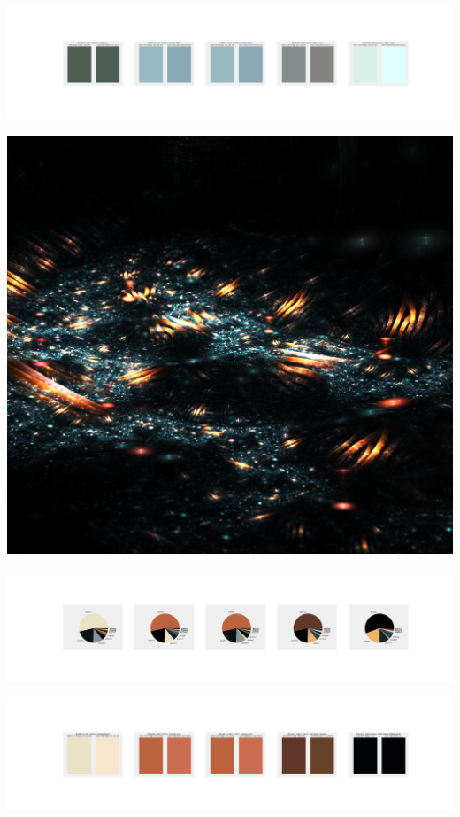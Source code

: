 \documentclass[11pt]{article}
\begin{document}
\begin{landscape}
    \begin{center}
    \includegraphics[width=250mm]{./nbimg/peak-441.jpg}
    \end{center}
    

    \begin{center}
    \includegraphics[width=\textwidth]{./nbimg/file (91).jpg}
    \end{center}

    \begin{center}
    \includegraphics[width=250mm]{./nbimg/pie-442.jpg}
    \end{center}

    \begin{center}
    \includegraphics[width=250mm]{./nbimg/peak-442.jpg}
    \end{center}
    


\end{landscape}
\end{document}
